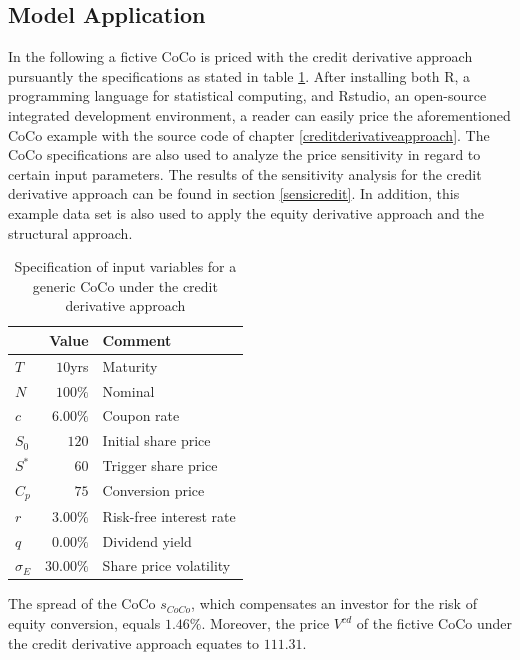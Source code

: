 \subsection{Model Application}

In the following a fictive CoCo is priced with the credit derivative approach pursuantly the specifications as stated in table \ref{creditcoco}. After installing both R, a programming language for statistical computing, and Rstudio, an open-source integrated development environment, a reader can easily price the aforementioned CoCo example with the source code of chapter \ref{creditderivativeapproach}. The CoCo specifications are also used to analyze the price sensitivity in regard to certain input parameters. The results of the sensitivity analysis for the credit derivative approach can be found in section \ref{sensicredit}. In addition, this example data set is also used to apply the equity derivative approach and the structural approach.

\begin{table}[H]
	\setlength{\extrarowheight}{2.5pt}
	\centering
	\begin{tabular}{lrl}
		\toprule
			 & \textbf{Value} & \textbf{Comment} \\
		\midrule
			$T$ & $10$yrs & Maturity \\
			$N$ & $100\%$ & Nominal \\			
			$c$ & $6.00\%$ & Coupon rate \\
			$S_0$ & $120$ & Initial share price\\
			$S^*$ & $60$ & Trigger share price \\
			$C_p$ & $75$ & Conversion price \\
			$r$ & $3.00 \%$ & Risk-free interest rate\\
			$q$ & $0.00\%$ & Dividend yield \\
			$\sigma_E$ & $30.00\%$ & Share price volatility \\
		\bottomrule
	\end{tabular}
	\caption[Specification of input variables for a generic CoCo under the credit derivative approach]{Specification of input variables for a generic CoCo under the credit derivative approach \citep{alvemar2012modelling}}
	\label{creditcoco}
\end{table}

The spread of the CoCo $s_{CoCo}$, which compensates an investor for the risk of equity conversion, equals $1.46\%$. Moreover,  the price $V^{cd}$ of the fictive CoCo under the credit derivative approach equates to $111.31$.


